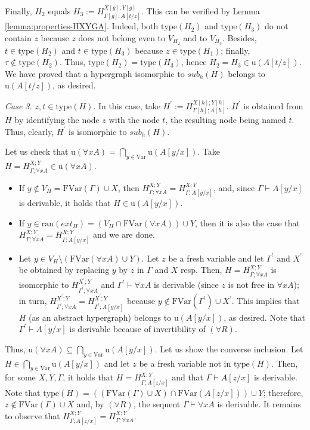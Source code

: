 \documentclass[a4paper,UKenglish,cleveref, autoref, thm-restate,pdfa]{lipics-v2021}
\newcommand{\eqdef}{:=}
\newcommand{\ran}{\mathrm{ran}}
\newcommand{\ext}{\mathit{ext}}
\newcommand{\type}{\mathrm{type}}
\newcommand{\Var}{\mathrm{Var}}
\newcommand{\FVar}{\mathrm{FVar}}
\newcommand{\sub}{\mathit{sub}}
\begin{document}
Finally, $H_2$ equals $H_3 \eqdef H^{X[g];Y[g]}_{\Gamma[g];A[t/z]}$. This can be verified by Lemma \ref{lemma:properties-HXYGA}. Indeed, both $\type(H_2)$ and $\type(H_3)$ do not contain $z$ because $z$ does not belong even to $V_{H_2}$ and to $V_{H_3}$. Besides, $t \in \type(H_2)$ and $t \in \type(H_3)$ because $z \in \type(H_1)$; finally, $\tau \notin \type(H_2)$. Thus, $\type(H_2) = \type(H_3)$, hence $H_2=H_3 \in \mathrm{u}(A[t/z])$. We have proved that a hypergraph isomorphic to $\sub_h(H)$ belongs to $\mathrm{u}(A[t/z])$, as desired.

\textit{Case 3.} $z,t \in \type(H)$. In this case, take $H^\prime \eqdef H^{X[h];Y[h]}_{\Gamma[h];A[h]}$. $H^\prime$ is obtained from $H$ by identifying the node $z$ with the node $t$, the resulting node being named $t$. Thus, clearly, $H^\prime$ is isomorphic to $\sub_h(H)$.

Let us check that $\mathrm{u}(\forall x A) = \bigcap\limits_{y \in \Var} \mathrm{u}(A[y/x])$. Take $H = H^{X;Y}_{\Gamma;\forall x A} \in \mathrm{u}(\forall x A)$. 
\begin{itemize}
	\item If $y \notin V_H = \FVar(\Gamma) \cup X$, then $H^{X;Y}_{\Gamma; \forall x A} = H^{X;Y}_{\Gamma;A[y/x]}$, and, since $\Gamma \vdash A[y/x]$ is derivable, it holds that $H \in \mathrm{u}(A[y/x])$. 
	\item If $y \in \ran(\ext_H) = (V_H \cap \FVar(\forall x A)) \cup Y$, then it is also the case that $H^{X;Y}_{\Gamma; \forall x A} = H^{X;Y}_{\Gamma;A[y/x]}$ and we are done.
	\item Let $y \in V_H \setminus (\FVar(\forall x A) \cup Y)$. Let $z$ be a fresh variable and let $\Gamma^\prime$ and $X^\prime$ be obtained by replacing $y$ by $z$ in $\Gamma$ and $X$ resp. Then, $H = H^{X;Y}_{\Gamma;\forall x A}$ is isomorphic to $H_{\Gamma^\prime;\forall x A}^{X^\prime;Y}$ and $\Gamma^\prime \vdash \forall x A$ is derivable (since $z$ is not free in $\forall x A$); in turn, $H_{\Gamma^\prime;\forall x A}^{X^\prime;Y} = H_{\Gamma^\prime;A[y/x]}^{X^\prime;Y}$ because $y \notin \FVar(\Gamma^\prime) \cup X^\prime$. This implies that $H$ (as an abstract hypergraph) belongs to $\mathrm{u}(A[y/x])$, as desired. Note that $\Gamma^\prime \vdash A[y/x]$ is derivable because of invertibility of $(\forall R)$. 
\end{itemize}
Thus, $\mathrm{u}(\forall x A) \subseteq \bigcap\limits_{y \in \Var} \mathrm{u}(A[y/x])$. Let us show the converse inclusion. Let $H \in \bigcap\limits_{y \in \Var} \mathrm{u}(A[y/x])$ and let $z$ be a fresh variable not in $\type(H)$. Then, for some $X,Y,\Gamma$, it holds that $H = H^{X;Y}_{\Gamma;A[z/x]}$ and that $\Gamma \vdash A[z/x]$ is derivable. Note that $\type(H) = ((\FVar(\Gamma) \cup X) \cap \FVar(A[z/x])) \cup Y$; therefore, $z \notin \FVar(\Gamma) \cup X$ and, by $(\forall R)$, the sequent $\Gamma \vdash \forall x A$ is derivable. It remains to observe that $H^{X;Y}_{\Gamma;A[z/x]} = H^{X;Y}_{\Gamma;\forall x A}$.
\end{document}
